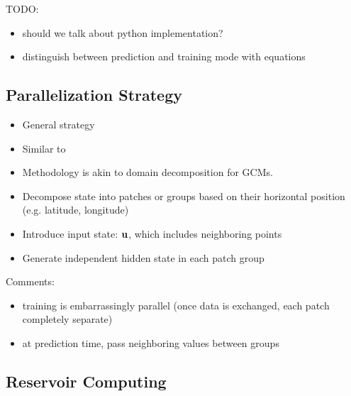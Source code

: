 TODO:
\begin{itemize}
    \item should we talk about python implementation?
    \item distinguish between prediction and training mode with equations
\end{itemize}


\subsection{Parallelization Strategy}
\label{subsec:parallelization}


\begin{itemize}
    \item General strategy \citep{pathak_model-free_2018}
    \item Similar to \citep{arcomano_machine_2020}
    \item Methodology is akin to domain decomposition for GCMs.
    \item Decompose state into patches or groups based on their horizontal
        position (e.g. latitude, longitude)
    \item Introduce input state: $\mathbf{u}$, which includes neighboring points
    \item Generate independent hidden state in each patch group
\end{itemize}

Comments:
\begin{itemize}
    \item training is embarrassingly parallel (once data is exchanged, each
        patch completely separate)
    \item at prediction time, pass neighboring values between groups
\end{itemize}


\subsection{Reservoir Computing}
\label{subsec:rc}

